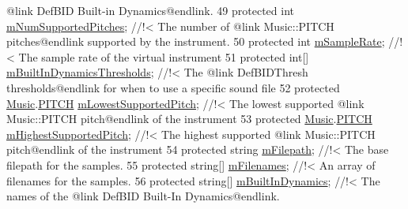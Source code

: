 \begin{DoxyCodeInclude}
{       @link DefBID Built-in Dynamics@endlink.}
49 \textcolor{comment}{}    \textcolor{keyword}{protected} \textcolor{keywordtype}{int}                                \hyperlink{group___v_i_base_pro_var_gafc759a16324cf9b3f230bcbf040afcd2}{mNumSupportedPitches}; \textcolor{comment}{//!< The number
       of @link Music::PITCH pitches@endlink supported by the instrument.}
50 \textcolor{comment}{}    \textcolor{keyword}{protected} \textcolor{keywordtype}{int}                                \hyperlink{group___v_i_base_pro_var_ga80b3d2ff29b27698eea6bcf2f8ddc5d7}{mSampleRate}; \textcolor{comment}{//!< The sample rate of the
       virtual instrument}
51 \textcolor{comment}{}    \textcolor{keyword}{protected} \textcolor{keywordtype}{int}[]                              \hyperlink{group___v_i_base_pro_var_gae3db4264dc2a96e99ea680c6d637e6bf}{mBuiltInDynamicsThresholds}; \textcolor{comment}{//!<
       The @link DefBIDThresh thresholds@endlink for when to use a specific sound file}
52 \textcolor{comment}{}    \textcolor{keyword}{protected} \hyperlink{class_music}{Music}.\hyperlink{group___music_enums_ga508f69b199ea518f935486c990edac1d}{PITCH}                        \hyperlink{group___v_i_base_pro_var_ga3cae52b1bcc0178a8a6b03c7aaf7aac8}{mLowestSupportedPitch}; \textcolor{comment}{//!<
       The lowest supported @link Music::PITCH pitch@endlink of the instrument}
53 \textcolor{comment}{}    \textcolor{keyword}{protected} \hyperlink{class_music}{Music}.\hyperlink{group___music_enums_ga508f69b199ea518f935486c990edac1d}{PITCH}                        
      \hyperlink{group___v_i_base_pro_var_ga61fb2c33b53a0f663047779d7ceb18f3}{mHighestSupportedPitch}; \textcolor{comment}{//!< The highest supported @link Music::PITCH pitch@endlink
       of the instrument}
54 \textcolor{comment}{}    \textcolor{keyword}{protected} \textcolor{keywordtype}{string}                             \hyperlink{group___v_i_base_pro_var_gac428224be859933d720a9c533fdb5643}{mFilepath}; \textcolor{comment}{//!< The base filepath for the
       samples.}
55 \textcolor{comment}{}    \textcolor{keyword}{protected} \textcolor{keywordtype}{string}[]                           \hyperlink{group___v_i_base_pro_var_gab2add474ca506357688b5dd08cac4cb5}{mFilenames}; \textcolor{comment}{//!< An array of filenames for the
       samples.}
56 \textcolor{comment}{}    \textcolor{keyword}{protected} \textcolor{keywordtype}{string}[]                           \hyperlink{group___v_i_base_pro_var_ga87961e72f25fbc2256b614a394aa6f13}{mBuiltInDynamics}; \textcolor{comment}{//!< The names of the
       @link DefBID Built-In Dynamics@endlink.}

\end{DoxyCodeInclude}
